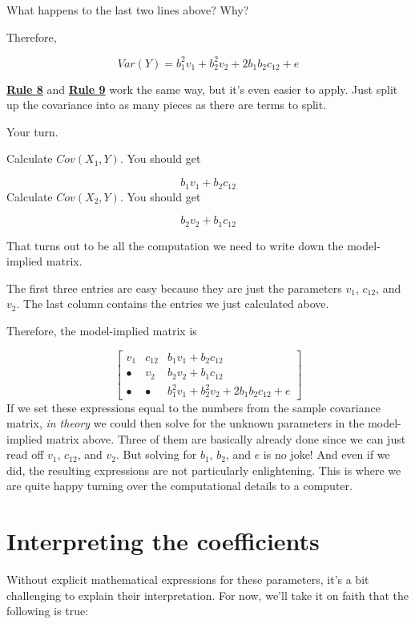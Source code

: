 \documentclass[
]{book}
\begin{document}
What happens to the last two lines above? Why?

Therefore,

\[
Var(Y) = b_{1}^{2} v_{1} + b_{2}^{2} v_{2} + 2b_{1}b_{2} c_{12} + e
\]

\href{./covariance.html\#Rule8}{\textbf{Rule 8}} and \href{./covariance.html\#Rule9}{\textbf{Rule 9}} work the same way, but it's even easier to apply. Just split up the covariance into as many pieces as there are terms to split.

Your turn.

Calculate \(Cov(X_{1}, Y)\). You should get

\[
b_{1} v_{1} + b_{2} c_{12}
\]
Calculate \(Cov(X_{2}, Y)\). You should get

\[
b_{2} v_{2} + b_{1} c_{12}
\]

That turns out to be all the computation we need to write down the model-implied matrix.

The first three entries are easy because they are just the parameters \(v_{1}\), \(c_{12}\), and \(v_{2}\). The last column contains the entries we just calculated above.

Therefore, the model-implied matrix is

\[
\begin{bmatrix}
v_{1}   &    c_{12}  &   b_{1} v_{1} + b_{2} c_{12} \\
\bullet &    v_{2}   &   b_{2} v_{2} + b_{1} c_{12} \\
\bullet &    \bullet &   b_{1}^{2} v_{1} + b_{2}^{2} v_{2} + 2b_{1}b_{2} c_{12} + e
\end{bmatrix}
\]
If we set these expressions equal to the numbers from the sample covariance matrix, \emph{in theory} we could then solve for the unknown parameters in the model-implied matrix above. Three of them are basically already done since we can just read off \(v_{1}\), \(c_{12}\), and \(v_{2}\). But solving for \(b_{1}\), \(b_{2}\), and \(e\) is no joke! And even if we did, the resulting expressions are not particularly enlightening. This is where we are quite happy turning over the computational details to a computer.

\hypertarget{multiple-interpreting}{%
\section{Interpreting the coefficients}\label{multiple-interpreting}}

Without explicit mathematical expressions for these parameters, it's a bit challenging to explain their interpretation. For now, we'll take it on faith that the following is true:
\end{document}
